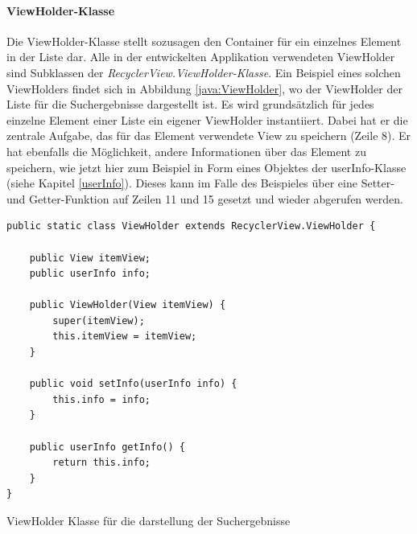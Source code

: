 \documentclass[a4paper,11pt]{report}
\newenvironment{code}{\captionsetup{type=figure}}{}
\begin{document}
				\paragraph{ViewHolder-Klasse}
				Die ViewHolder-Klasse stellt sozusagen den Container für ein einzelnes Element in der Liste dar. Alle in der entwickelten Applikation verwendeten ViewHolder sind Subklassen der \emph{RecyclerView.ViewHolder-Klasse}. Ein Beispiel eines solchen ViewHolders findet sich in Abbildung \ref{java:ViewHolder}, wo der ViewHolder der Liste für die Suchergebnisse dargestellt ist. Es wird grundsätzlich für jedes einzelne Element einer Liste ein eigener ViewHolder instantiiert. Dabei hat er die zentrale Aufgabe, das für das Element verwendete View zu speichern (Zeile 8). Er hat ebenfalls die Möglichkeit, andere Informationen über das Element zu speichern, wie jetzt hier zum Beispiel in Form eines Objektes der userInfo-Klasse (siehe Kapitel \ref{userInfo}). Dieses kann im Falle des Beispieles über eine Setter- und Getter-Funktion auf Zeilen 11 und 15 gesetzt und wieder abgerufen werden.
\begin{code}
	\begin{center}
		\begin{verbatim}
public static class ViewHolder extends RecyclerView.ViewHolder {

	public View itemView;
	public userInfo info;

	public ViewHolder(View itemView) {
		super(itemView);
		this.itemView = itemView;
	}

	public void setInfo(userInfo info) {
		this.info = info;
	}

	public userInfo getInfo() {
		return this.info;
	}
}
		\end{verbatim}
		\caption{ViewHolder Klasse für die darstellung der Suchergebnisse}\label{java:ViewHolder}
	\end{center}
\end{code}
				
\end{document}
